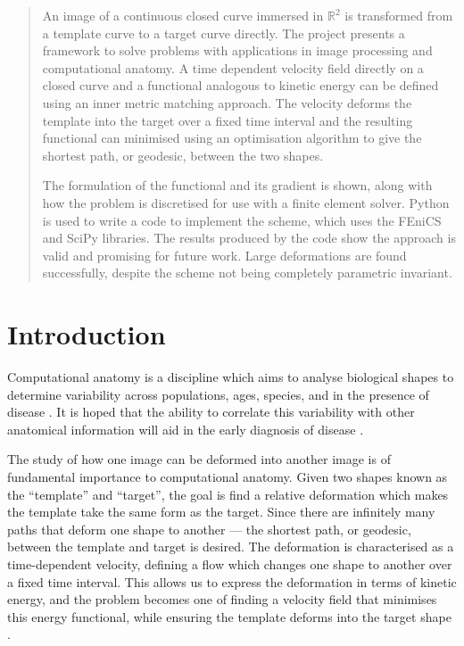 \documentclass[a4paper, 12pt]{article}
\begin{document}
\maketitle
\newpage

\pagestyle{plain}
\setcounter{page}{1}

\begin{abstract}
  An image of a continuous closed curve immersed in $\mathbb{R}^2$ is
  transformed from a template curve to a target curve directly. The project
  presents a framework to solve problems with applications in image processing
  and computational anatomy. A time dependent velocity field directly on a
  closed curve and a functional analogous to kinetic energy can be defined using
  an inner metric matching approach. The velocity deforms the template into the
  target over a fixed time interval and the resulting functional can minimised
  using an optimisation algorithm to give the shortest path, or geodesic,
  between the two shapes.

  The formulation of the functional and its gradient is shown, along with how
  the problem is discretised for use with a finite element solver. Python is
  used to write a code to implement the scheme, which uses the FEniCS and SciPy
  libraries. The results produced by the code show the approach is valid and
  promising for future work. Large deformations are found successfully, despite
  the scheme not being completely parametric invariant.

\end{abstract}
\newpage
\tableofcontents
\newpage
\listoffigures
\newpage
\pagestyle{plain}
\setcounter{page}{1}

\onehalfspacing
\section{Introduction}

Computational anatomy is a discipline which aims to analyse biological shapes to
determine variability across populations, ages, species, and in the presence of
disease \cite{miller2001group, miller2009emerging}. It is hoped that the ability
to correlate this variability with other anatomical information will aid in the
early diagnosis of disease \cite{mfca11}.

The study of how one image can be deformed into another image is of fundamental
importance to computational anatomy. Given two shapes known as the ``template''
and ``target'', the goal is find a relative deformation which makes the template
take the same form as the target. Since there are infinitely many paths that
deform one shape to another --- the shortest path, or geodesic, between the
template and target is desired. The deformation is characterised as a
time-dependent velocity, defining a flow which changes one shape to another over
a fixed time interval. This allows us to express the deformation in terms of
kinetic energy, and the problem becomes one of finding a velocity field that
minimises this energy functional, while ensuring the template deforms into the
target shape \cite{beg2005computing}.
\end{document}
